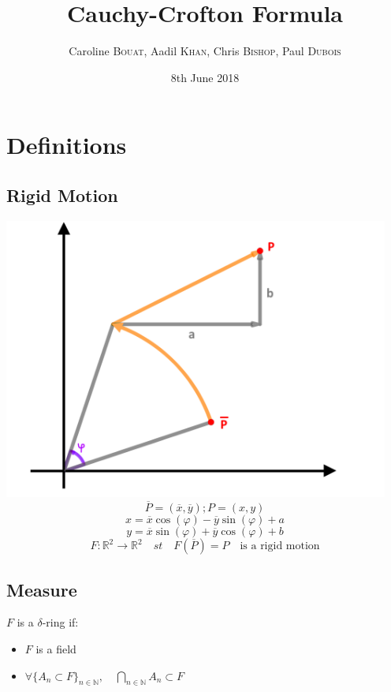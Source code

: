 \documentclass[a4paper]{article}
\title{Cauchy-Crofton Formula}
\author{Caroline \textsc{Bouat}, Aadil \textsc{Khan}, Chris \textsc{Bishop}, Paul \textsc{Dubois}}
\date{8th June 2018}
\begin{document}
\maketitle



\section{Definitions}
\subsection{Rigid Motion}
\includegraphics[width=360pt]{img/figureRigidMotion.png}
$$\overline{P} = (\overline{x}, \overline{y}) ; P = (x, y)$$
$$x=\overline{x} \cos (\varphi) - \overline{y} \sin (\varphi) + a$$
$$y=\overline{x} \sin (\varphi) + \overline{y} \cos (\varphi) + b$$
$$F:\mathbb{R}^2 \to  \mathbb{R}^2 \quad st \quad  F(\overline{P}) = P \quad \text{is a rigid motion}$$

\subsection{Measure}
$F$ is a $\delta$-ring if:
\begin{itemize}
\item $F$ is a field
\item $\forall \{A_n \subset F \}_{n \in \mathbb{N}},  \quad \bigcap\limits_{n \in \mathbb{N}} A_n \subset F$
\end{itemize}
\end{document}
